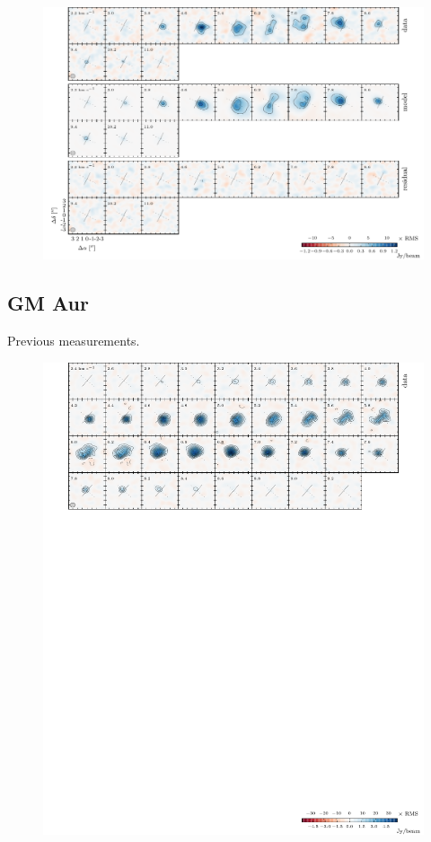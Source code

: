 \documentclass[twocolumn]{aastex6}
\begin{document}
\begin{figure}[htb]
\begin{center}
  \includegraphics{LkCa15.pdf}
  \end{center}
\end{figure}

\subsection{GM Aur}
Previous measurements.

\begin{figure}[htb]
\begin{center}
  \includegraphics{GMAur.pdf}
  \end{center}
\end{figure}
\end{document}
